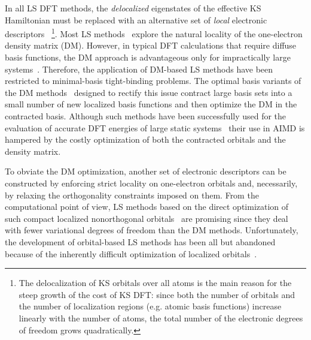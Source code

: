 \documentclass[aps,prl,reprint,amsmath,amssymb]{revtex4-1}
\begin{document}
In all LS DFT methods, the \emph{delocalized} eigenstates of the effective KS Hamiltonian must be replaced with an alternative set of \emph{local} electronic descriptors
~\footnote{The delocalization of KS orbitals over all atoms is the main reason for the steep growth of the cost of KS DFT: since both the number of orbitals and the number of localization regions (e.g. atomic basis functions) increase linearly with the number of atoms, the total number of the electronic degrees of freedom grows quadratically.}. 
Most LS methods~\cite{a:ls-rev-1999,a:ls-rev-2012} explore the natural locality of the one-electron density matrix (DM). 
However, in typical DFT calculations that require diffuse basis functions, the DM approach is advantageous only for impractically large systems~\cite{a:ls-rev-1999,a:ls-dm-sign,a:almo-ls}.
Therefore, the application of DM-based LS methods have been restricted to minimal-basis tight-binding problems. 
The optimal basis variants of the DM methods~\cite{a:ls-stechel-1994,a:ls-gillan-1995,a:ls-gillan-1996,a:ls-onetep-2003} designed to rectify this issue contract large basis sets into a small number of new localized basis functions and then optimize the DM in the contracted basis. 
Although such methods have been successfully used for the evaluation of accurate DFT energies of large static systems~\cite{a:ls-onetep-2009,a:ls-conquest-2010,a:ls-onetep-2010-app1,a:ls-rev-2012} their use in AIMD is hampered by the costly optimization of both the contracted orbitals and the density matrix. 


To obviate the DM optimization, another set of electronic descriptors can be constructed by enforcing strict locality on one-electron orbitals and, necessarily, by relaxing the orthogonality constraints imposed on them. 
From the computational point of view, LS methods based on the direct optimization of such compact localized nonorthogonal orbitals~\cite{a:ls-galli-parrinello-1992,a:ls-mauri-galli-car-1993,a:ls-ordejon-1993,a:ls-mauri-galli-1994,a:ls-ordejon-1995,a:ls-kim-mauri-galli-1995,a:ls-fattebert-2004,a:ls-fattebert-2006,a:burger-yang-2008} are promising since they deal with fewer variational degrees of freedom than the DM methods. 
Unfortunately, the development of orbital-based LS methods has been all but abandoned because of the inherently difficult optimization of localized orbitals~\cite{a:ls-mauri-galli-car-1993,a:ls-ordejon-1995,a:ls-fattebert-2004,a:ls-rev-1999,a:weitao-yang-2013}. 
\end{document}
